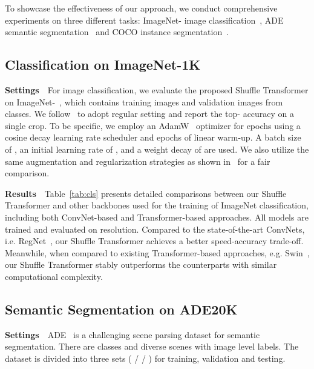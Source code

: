 \documentclass{article}
\begin{document}
To showcase the effectiveness of our approach, we conduct comprehensive experiments on three different tasks: ImageNet- image classification~\citep{deng2009imagenet}, ADE semantic segmentation~\cite{zhou2017scene} and COCO instance segmentation~\cite{lin2014microsoft}. 



\subsection{Classification on ImageNet-1K}
\textbf{Settings}~~For image classification, we evaluate the proposed Shuffle Transformer on ImageNet-~\cite{deng2009imagenet}, which contains  training images and  validation images from  classes. We follow~\cite{liu2021Swin} to adopt regular  setting and report the top- accuracy on a single crop.
To be specific, we employ an AdamW~\cite{loshchilov2017decoupled} optimizer for  epochs using a cosine decay learning rate scheduler and  epochs of linear warm-up. A batch size of , an initial learning rate of , and a weight decay of  are used. We also utilize the same augmentation and regularization strategies as shown in~\cite{liu2021Swin} for a fair comparison.



\textbf{Results}~~Table~\ref{tab:cls} presents detailed comparisons between our Shuffle Transformer and other backbones used for the training of ImageNet classification, including both ConvNet-based and Transformer-based approaches. All models are trained and evaluated on  resolution. Compared to the state-of-the-art ConvNets, i.e. RegNet~\cite{radosavovic2020designing}, our Shuffle Transformer achieves a better speed-accuracy trade-off. Meanwhile, when compared to existing Transformer-based approaches, e.g. Swin~\cite{liu2021Swin}, our Shuffle Transformer stably outperforms the counterparts with similar computational complexity.





\subsection{Semantic Segmentation on ADE20K}
\textbf{Settings}~~ADE~\cite{zhou2017scene} is a challenging scene parsing dataset for semantic segmentation. There are  classes and diverse scenes with  image level labels. The dataset is divided into three sets ( /  / ) for training, validation and testing. 
\end{document}
